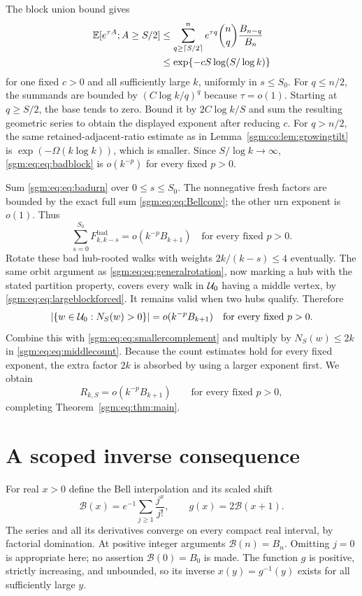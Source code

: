 \documentclass[11pt,letterpaper]{article}
\theoremstyle{remark}\newtheorem{remark}[theorem]{Remark}
\theoremstyle{definition}\newtheorem{definition}[theorem]{Definition}
\begin{document}
The block union bound gives
\begin{align}
 \mathbb E[e^{\tau A};A\ge S/2]
 &\le\sum_{q\ge\lceil S/2\rceil}^{n}
       e^{\tau q}\binom nq\frac{B_{n-q}}{B_n}\nonumber\\
 &\le\exp\{-cS\log(S/\log k)\}\label{sgm:eq:eq:badblock}
\end{align}
for one fixed $c>0$ and all sufficiently large $k$, uniformly in $s\le S_0$. For $q\le n/2$, the summands are bounded by $(C\log k/q)^q$ because $\tau=o(1)$. Starting at $q\ge S/2$, the base tends to zero. Bound it by $2C\log k/S$ and sum the resulting geometric series to obtain the displayed exponent after reducing $c$. For $q>n/2$, the same retained-adjacent-ratio estimate as in Lemma~\ref{sgm:co:lem:growingtilt} is $\exp(-\Omega(k\log k))$, which is smaller. Since $S/\log k\to\infty$, \eqref{sgm:eq:eq:badblock} is $o(k^{-p})$ for every fixed $p>0$.

Sum \eqref{sgm:eq:eq:badurn} over $0\le s\le S_0$. The nonnegative fresh factors are bounded by the exact full sum \eqref{sgm:eq:eq:Bellconv}; the other urn exponent is $o(1)$. Thus
\[
 \sum_{s=0}^{S_0}F^{\mathrm{bad}}_{k,k-s}
   =o(k^{-p}B_{k+1})\quad\text{for every fixed }p>0.
\]
Rotate these bad hub-rooted walks with weights $2k/(k-s)\le4$ eventually. The same orbit argument as \eqref{sgm:eq:eq:generalrotation}, now marking a hub with the stated partition property, covers every walk in $\mathcal U_0$ having a middle vertex, by \eqref{sgm:eq:eq:largeblockforced}. It remains valid when two hubs qualify. Therefore
\[
 |\{w\in\mathcal U_0:N_S(w)>0\}|=o(k^{-p}B_{k+1})
 \quad\text{for every fixed }p>0.
\]
Combine this with \eqref{sgm:eq:eq:smallercomplement} and multiply by $N_S(w)\le2k$ in \eqref{sgm:eq:eq:middlecount}. Because the count estimates hold for every fixed exponent, the extra factor $2k$ is absorbed by using a larger exponent first. We obtain
\[
 R_{k,S}=o(k^{-p}B_{k+1})\qquad\text{for every fixed }p>0,
\]
completing Theorem~\ref{sgm:eq:thm:main}.

\section{A scoped inverse consequence}\label{sgm:eq:sec:inverse}
For real $x>0$ define the Bell interpolation and its scaled shift
\[
 \mathcal B(x)=e^{-1}\sum_{j\ge1}\frac{j^x}{j!},\qquad
 g(x)=2\mathcal B(x+1).
\]
The series and all its derivatives converge on every compact real interval, by factorial domination. At positive integer arguments $\mathcal B(n)=B_n$. Omitting $j=0$ is appropriate here; no assertion $\mathcal B(0)=B_0$ is made. The function $g$ is positive, strictly increasing, and unbounded, so its inverse $x(y)=g^{-1}(y)$ exists for all sufficiently large $y$.
\end{document}
